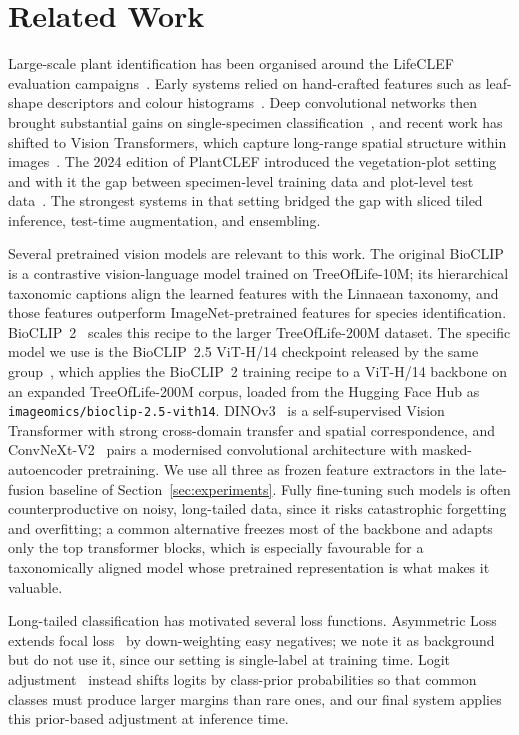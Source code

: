 \chapter{Related Work}
\label{sec:related}

Large-scale plant identification has been organised around the LifeCLEF evaluation campaigns~\cite{lifeclef2026}. Early systems relied on hand-crafted features such as leaf-shape descriptors and colour histograms~\cite{goeau2013pl}. Deep convolutional networks then brought substantial gains on single-specimen classification~\cite{lee2017deep}, and recent work has shifted to Vision Transformers, which capture long-range spatial structure within images~\cite{dosovitskiy2021image}. The 2024 edition of PlantCLEF introduced the vegetation-plot setting and with it the gap between specimen-level training data and plot-level test data~\cite{goeau2024plantclef}. The strongest systems in that setting bridged the gap with sliced tiled inference, test-time augmentation, and ensembling.

Several pretrained vision models are relevant to this work. The original BioCLIP~\cite{stevens2024bioclip} is a contrastive vision-language model trained on TreeOfLife-10M; its hierarchical taxonomic captions align the learned features with the Linnaean taxonomy, and those features outperform ImageNet-pretrained features for species identification. BioCLIP~2~\cite{gu2025bioclip2} scales this recipe to the larger TreeOfLife-200M dataset. The specific model we use is the BioCLIP~2.5 ViT-H/14 checkpoint released by the same group~\cite{bioclip25hf}, which applies the BioCLIP~2 training recipe to a ViT-H/14 backbone on an expanded TreeOfLife-200M corpus, loaded from the Hugging Face Hub as \texttt{imageomics/bioclip-2.5-vith14}. DINOv3~\cite{simeoni2025dinov3} is a self-supervised Vision Transformer with strong cross-domain transfer and spatial correspondence, and ConvNeXt-V2~\cite{woo2023convnextv2} pairs a modernised convolutional architecture with masked-autoencoder pretraining. We use all three as frozen feature extractors in the late-fusion baseline of Section~\ref{sec:experiments}. Fully fine-tuning such models is often counterproductive on noisy, long-tailed data, since it risks catastrophic forgetting and overfitting; a common alternative freezes most of the backbone and adapts only the top transformer blocks, which is especially favourable for a taxonomically aligned model whose pretrained representation is what makes it valuable.

Long-tailed classification has motivated several loss functions. Asymmetric Loss~\cite{ridnik2021asymmetric} extends focal loss~\cite{lin2017focal} by down-weighting easy negatives; we note it as background but do not use it, since our setting is single-label at training time. Logit adjustment~\cite{menon2021longtail} instead shifts logits by class-prior probabilities so that common classes must produce larger margins than rare ones, and our final system applies this prior-based adjustment at inference time.
